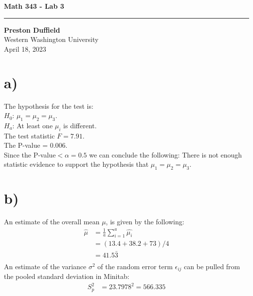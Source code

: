 \documentclass{article}
\begin{document}
\noindent
\begin{minipage}[t]{0.6\textwidth}
    \begin{flushleft}
        \LARGE\textbf{Math 343 - Lab 3} \\
        \vspace{6pt} %
        \hrule width 10cm
        \vspace{12pt}
        \large\textbf{Preston Duffield} \\
        \large Western Washington University \\
        April 18, 2023
        \vspace{24pt}
    \end{flushleft}
\end{minipage}

\section*{a)}
The hypothesis for the test is: \\
$H_0$: $\mu_1 = \mu_2 = \mu_3$. \\
$H_a$: At least one $\mu_i$ is different. \\
The test statistic $F = 7.91$. \\
The P-value = 0.006. \\
Since the P-value$< \alpha = 0.5$ we can conclude the following:
There is not enough statistic evidence to support the hypothesis that $\mu_1 = \mu_2 = \mu_3$.

\section*{b)}
An estimate of the overall mean $\mu$, is given by the following:
\begin{align*}
    \hat{\mu} &= \frac{1}{a} \sum_{i=1}^{a} \hat{\mu_i} \\
              &= (13.4 + 38.2 + 73) / 4 \\
              &= 41.5\bar{3} \\
\end{align*}
An estimate of the variance $\sigma^2$ of the random error term $\epsilon_{ij}$ can be pulled from the pooled standard deviation in Minitab:
\begin{align*}
    S_p ^2 &= 23.7978^2 = 566.335
\end{align*}

\clearpage
\end{document}
